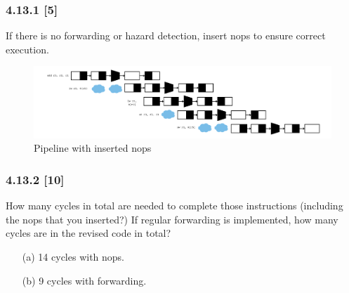 \documentclass[fleqn]{article}
\begin{document}
\subsubsection*{4.13.1 [5] \textrangle} If there is no forwarding or hazard detection, insert nops to ensure correct execution.
\begin{figure}[H]
    \centering
    \includegraphics[width=6.5in]{p4.13.1.png}
    \caption{Pipeline with inserted nops}
\end{figure}

\subsubsection*{4.13.2 [10] \textrangle} How many cycles in total are needed to complete those instructions (including the nops that you
inserted?) If regular forwarding is implemented, how many cycles are in the revised code in total?
\begin{itemize}
    \item[(a)] 14 cycles with nops.
    \item[(b)] 9 cycles with forwarding.
\end{itemize}
\vspace{0.125in}
\end{document}
